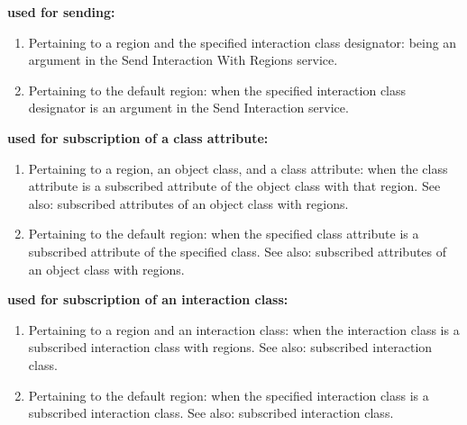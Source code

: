 \par\noindent\textbf{used for sending:}\par

\begin{enumerate}[label=\alph*)]
\item Pertaining to a region and the specified interaction class designator: being an argument in the Send Interaction With Regions service.
\item Pertaining to the default region: when the specified interaction class designator is an argument in the Send Interaction service.
\par{}
\end{enumerate}

\par\noindent\textbf{used for subscription of a class attribute:}\par

\begin{enumerate}[label=\alph*)]
\item Pertaining to a region, an object class, and a class attribute: when the class attribute is a subscribed attribute of the object class with that region. See also: subscribed attributes of an object class with regions.
\par{}
\item Pertaining to the default region: when the specified class attribute is a subscribed attribute of the specified class. See also: subscribed attributes of an object class with regions.
\par{}
\end{enumerate}

\par\noindent\textbf{used for subscription of an interaction class:}\par

\begin{enumerate}[label=\alph*)]
\item Pertaining to a region and an interaction class: when the interaction class is a subscribed interaction class with regions. See also: subscribed interaction class.
\par{}
\item Pertaining to the default region: when the specified interaction class is a subscribed interaction class. See also: subscribed interaction class.
\par{}
\end{enumerate}

